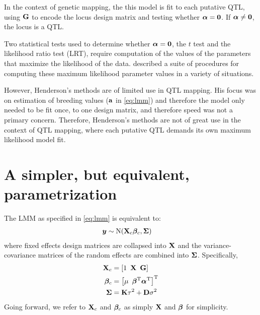 In the context of genetic mapping, the this model is fit to each putative QTL, using $\mathbf{G}$ to encode the locus design matrix and testing whether $\boldsymbol{\alpha} = \bm{0}$.
If $\boldsymbol{\alpha} \neq \bm{0}$, the locus is a QTL.

Two statistical tests used to determine whether $\boldsymbol{\alpha} = \bm{0}$, the $t$ test and the likelihood ratio test (LRT), require computation of the values of the parameters that maximize the likelihood of the data.
\citet{Henderson1984} described a suite of procedures for computing these maximum likelihood parameter values in a variety of situations.

However, Henderson's methods are of limited use in QTL mapping.
His focus was on estimation of breeding values ($\mathbf{a}$ in \cref{eq:lmm}) and therefore the model only needed to be fit once, to one design matrix, and therefore speed was not a primary concern.
Therefore, Henderson's methods are not of great use in the context of QTL mapping, where each putative QTL demands its own maximum likelihood model fit.







\section{A simpler, but equivalent, parametrization}

The LMM as specified in \cref{eq:lmm} is equivalent to:
\begin{align}
    \bm{y} &\sim \mathrm{N}(\mathbf{X}_c\boldsymbol{\beta}_c, \mathbf{\Sigma})
\end{align}
where fixed effects design matrices are collapsed into $\mathbf{X}$ and the variance-covariance matrices of the random effects are combined into $\mathbf{\Sigma}$.
Specifically,
\begin{align}
    \mathbf{X}_c     &= \left[1 \enspace \mathbf{X} \enspace \mathbf{G} \right]\\
    \boldsymbol{\beta}_c  &= \left[\mu \enspace \boldsymbol{\beta}^\mathrm{T} \boldsymbol{\alpha}^\mathrm{T} \right]^\mathrm{T}\\
    \mathbf{\Sigma} &= \mathbf{K} \tau^2 + \mathbf{D} \sigma^2
\end{align}
Going forward, we refer to $\mathbf{X}_c$ and $\boldsymbol{\beta}_c$ as simply $\mathbf{X}$ and $\boldsymbol{\beta}$ for simplicity.

